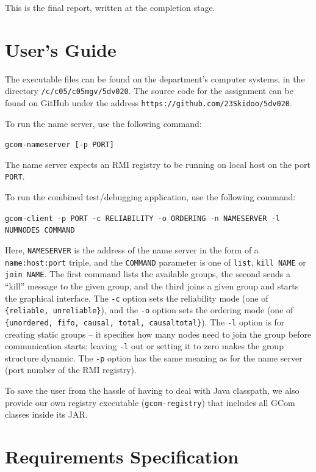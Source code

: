 \documentclass[10pt, oneside]{article}
\begin{document}
This is the final report, written at the completion stage.

\section{User's Guide}

The executable files can be found on the department's computer systems, in the
directory \texttt{/c/c05/c05mgv/5dv020}. The source code for the assignment can
be found on GitHub under the address
\texttt{https://github.com/23Skidoo/5dv020}.

To run the name server, use the following command:
\begin{center}\texttt{gcom-nameserver [-p PORT]}\end{center}
The name server expects an RMI registry to be running on local host on the port
\texttt{PORT}.

To run the combined test/debugging application, use the following command:
\begin{center}\texttt{gcom-client -p PORT -c RELIABILITY -o ORDERING  -n
    NAMESERVER -l NUMNODES COMMAND}\end{center}
Here, \texttt{NAMESERVER} is the address of the name server in the form of a
\texttt{name:host:port} triple, and the \texttt{COMMAND} parameter is one of
\texttt{list}, \texttt{kill NAME} or \texttt{join NAME}. The first command lists
the available groups, the second sends a ``kill'' message to the given group,
and the third joins a given group and starts the graphical interface. The
\texttt{-c} option sets the reliability mode (one of \texttt{\{reliable,
  unreliable\}}), and the \texttt{-o} option sets the ordering mode (one of
\texttt{\{unordered, fifo, causal, total, causaltotal\}}). The \texttt{-l}
option is for creating static groups -- it specifies how many nodes need to join
the group before communication starts; leaving \texttt{-l} out or setting it to
zero makes the group structure dynamic. The \texttt{-p} option has the same
meaning as for the name server (port number of the RMI registry).

To save the user from the hassle of having to deal with Java classpath, we also
provide our own registry executable (\texttt{gcom-registry}) that includes all
GCom classes inside its JAR.

\section{Requirements Specification}
\end{document}
